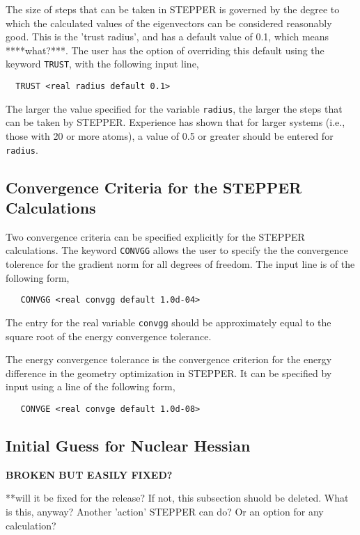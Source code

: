 
The size of steps that can be taken in STEPPER is governed by the degree
to which the calculated values of the eigenvectors can be considered 
reasonably good.  This is the 'trust radius', and has a default value of
0.1, which means ****what?***.  The user has the option of overriding this
default using the keyword \verb+TRUST+, with the following input line,

\begin{verbatim}
  TRUST <real radius default 0.1>
\end{verbatim}


The larger the value specified for the variable \verb+radius+, the larger 
the steps that can be taken by STEPPER. Experience has shown that for
larger systems (i.e., those with 20 or more atoms), a value of 0.5 or
greater should be entered for \verb+radius+.

\subsection{Convergence Criteria for the STEPPER Calculations}

Two convergence criteria can be specified explicitly for the 
STEPPER calculations.  The keyword \verb+CONVGG+ allows the user to
specify the the convergence tolerence for the gradient norm for
all degrees of freedom.  The input line is of the following form,

\begin{verbatim}
   CONVGG <real convgg default 1.0d-04>
\end{verbatim}

The entry for the real variable \verb+convgg+ should be approximately 
equal to the square root of the energy convergence tolerance.

The energy convergence tolerance is the convergence criterion for the 
energy difference in the geometry optimization in STEPPER.  It can be
specified by input using a line of the following form,

\begin{verbatim}
   CONVGE <real convge default 1.0d-08>
\end{verbatim}


\subsection{Initial Guess for Nuclear Hessian}

{\bf BROKEN BUT EASILY FIXED?}

\Large
**will it be fixed for the release?  If not, this subsection shuold
be deleted.  What is this, anyway?  Another 'action' STEPPER can do?
Or an option for any calculation?
\normalsize

